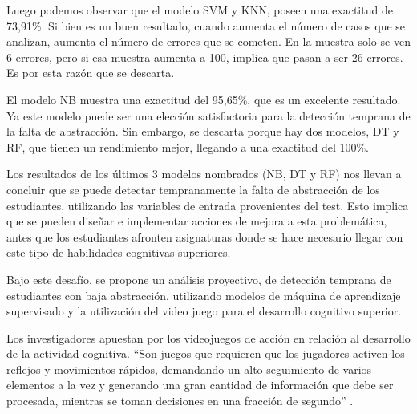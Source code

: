 \documentclass[spanish]{textolivre}
\begin{document}
Luego podemos observar que el modelo SVM y KNN, poseen una exactitud de 73,91\%. Si bien es un buen resultado, cuando aumenta el número de casos que se analizan, aumenta el número de errores que se cometen. En la muestra solo se ven 6 errores, pero si esa muestra aumenta a 100, implica que pasan a ser 26 errores. Es por esta razón que se descarta.

El modelo NB muestra una exactitud del 95,65\%, que es un excelente resultado. Ya este modelo puede ser una elección satisfactoria para la detección temprana de la falta de abstracción. Sin embargo, se descarta porque hay dos modelos, DT y RF, que tienen un rendimiento mejor, llegando a una exactitud del 100\%.

Los resultados de los últimos 3 modelos nombrados (NB, DT y RF) nos llevan a concluir que se puede detectar tempranamente la falta de abstracción de los estudiantes, utilizando las variables de entrada provenientes del test. Esto implica que se pueden diseñar e implementar acciones de mejora a esta problemática, antes que los estudiantes afronten asignaturas donde se hace necesario llegar con este tipo de habilidades cognitivas superiores.  

Bajo este desafío, se propone un análisis proyectivo, de detección temprana de estudiantes con baja abstracción, utilizando modelos de máquina de aprendizaje supervisado y la utilización del video juego para el desarrollo cognitivo superior.

Los investigadores apuestan por los videojuegos de acción en relación al desarrollo de la actividad cognitiva. “Son juegos que requieren que los jugadores activen los reflejos y movimientos rápidos, demandando un alto seguimiento de varios elementos a la vez y generando una gran cantidad de información que debe ser procesada, mientras se toman decisiones en una fracción de segundo” \cite[p. 29]{moscardi2018}. %



\printbibliography\label{sec-bib}
\end{document}
